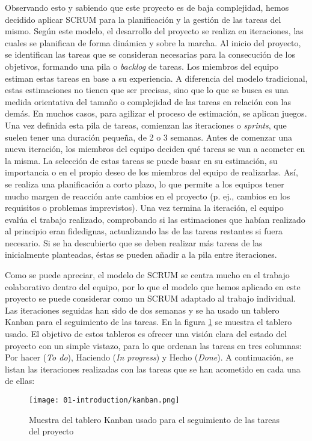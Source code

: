 Observando esto y sabiendo que este proyecto es de baja complejidad, hemos
decidido aplicar SCRUM para la planificación y la gestión de las tareas del
mismo. Según este modelo, el desarrollo del proyecto se realiza en iteraciones,
las cuales se planifican de forma dinámica y sobre la marcha. Al inicio del
proyecto, se identifican las tareas que se consideran necesarias para la
consecución de los objetivos, formando una pila o \textit{backlog} de tareas.
Los miembros del equipo estiman estas tareas en base a su experiencia. A
diferencia del modelo tradicional, estas estimaciones no tienen que ser
precisas, sino que lo que se busca es una medida orientativa del tamaño o
complejidad de las tareas en relación con las demás. En muchos casos, para
agilizar el proceso de estimación, se aplican juegos. Una vez definida esta pila
de tareas, comienzan las iteraciones o \textit{sprints}, que suelen tener una
duración pequeña, de 2 o 3 semanas. Antes de comenzar una nueva iteración, los
miembros del equipo deciden qué tareas se van a acometer en la misma. La
selección de estas tareas se puede basar en su estimación, su importancia o en
el propio deseo de los miembros del equipo de realizarlas. Así, se realiza una
planificación a corto plazo, lo que permite a los equipos tener mucho margen de
reacción ante cambios en el proyecto (p. ej., cambios en los requisitos o
problemas imprevistos). Una vez termina la iteración, el equipo evalúa el
trabajo realizado, comprobando si las estimaciones que habían realizado al
principio eran fidedignas, actualizando las de las tareas restantes si fuera
necesario. Si se ha descubierto que se deben realizar más tareas de las
inicialmente planteadas, éstas se pueden añadir a la pila entre iteraciones.

Como se puede apreciar, el modelo de SCRUM se centra mucho en el trabajo
colaborativo dentro del equipo, por lo que el modelo que hemos aplicado en este
proyecto se puede considerar como un SCRUM adaptado al trabajo individual. Las
iteraciones seguidas han sido de dos semanas y se ha usado un tablero Kanban
para el seguimiento de las tareas. En la figura \ref{fig:01-kanban} se muestra
el tablero usado. El objetivo de estos tableros es ofrecer una visión clara del
estado del proyecto con un simple vistazo, para lo que ordenan las tareas en
tres columnas: Por hacer (\textit{To do}), Haciendo (\textit{In progress}) y
Hecho (\textit{Done}). A continuación, se listan las iteraciones realizadas con
las tareas que se han acometido en cada una de ellas:

\begin{figure}
      \centering
      \texttt{[image: 01-introduction/kanban.png]}
      \caption{Muestra del tablero Kanban usado para el seguimiento de las tareas del proyecto}
      \label{fig:01-kanban}
\end{figure}

